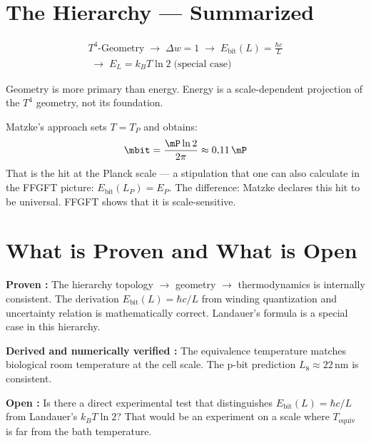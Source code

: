 \section{The Hierarchy --- Summarized}

\begin{multline*}
  T^4\text{-Geometry}
  \;\longrightarrow\; \Delta w = 1
  \;\longrightarrow\; E_\text{bit}(L) = \frac{\hbar c}{L} \\
  \;\longrightarrow\; E_L = k_BT\ln 2 \;\text{(special case)}
\end{multline*}

Geometry is more primary than energy. Energy is a scale-dependent
projection of the $T^4$ geometry, not its foundation. 

Matzke's approach sets $T = T_P$ and obtains:
\[
  \mbit = \frac{\mP \ln 2}{2\pi} \approx 0{,}11\,\mP
\]
That is the hit at the Planck scale --- a stipulation that one
can also calculate in the FFGFT picture: $E_\text{bit}(L_P) = E_P$.
The difference: Matzke declares this hit to be universal.
FFGFT shows that it is scale-sensitive. 

\section{What is Proven and What is Open}

\textbf{Proven :} The hierarchy topology $\to$ geometry $\to$
thermodynamics is internally consistent. The derivation $E_\text{bit}(L) = \hbar c/L$
from winding quantization and uncertainty relation is mathematically correct.
Landauer's formula is a special case in this hierarchy.

\textbf{Derived and numerically verified :} The equivalence temperature
matches biological room temperature at the cell scale.
The p-bit prediction $L_8 \approx 22$\,nm is consistent.

\textbf{Open :} Is there a direct experimental test that
distinguishes $E_\text{bit}(L) = \hbar c/L$ from Landauer's $k_BT\ln 2$?
That would be an experiment on a scale where $T_\text{equiv}$ is far
from the bath temperature.